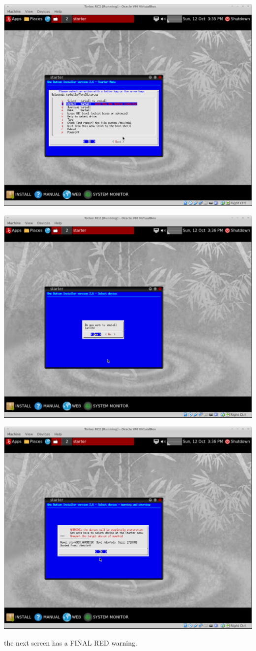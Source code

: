 \documentclass[12pt,a4paper]{book}
\begin{document}
\includegraphics[width=0.7\linewidth]{screen-shots/torios-rc2-install4}

\includegraphics[width=0.7\linewidth]{screen-shots/torios-rc2-install5}

\includegraphics[width=0.7\linewidth]{screen-shots/torios-rc2-install6}


the next screen has a FINAL RED warning. \\ 
\end{document}
